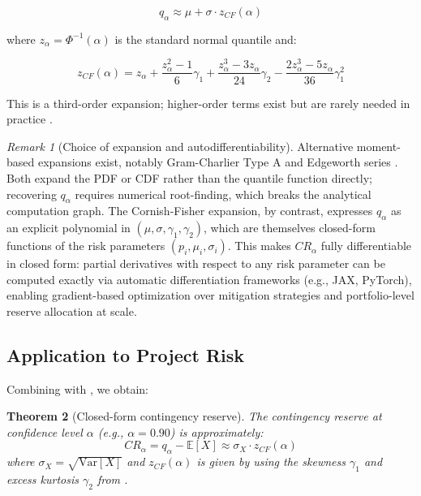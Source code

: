 \documentclass[12pt,a4paper]{article}
\newtheorem{theorem}{Theorem}[section]
\theoremstyle{definition}
\theoremstyle{remark}
\newtheorem{remark}[theorem]{Remark}
\newcommand{\E}{\mathbb{E}}
\newcommand{\Var}{\mathrm{Var}}
\begin{document}
\begin{equation}
    q_\alpha \approx \mu + \sigma \cdot z_{CF}(\alpha)
\end{equation}

where $z_\alpha = \Phi^{-1}(\alpha)$ is the standard normal quantile and:

\begin{equation}
\label{eq:cornish_fisher}
    z_{CF}(\alpha) = z_\alpha + \frac{z_\alpha^2 - 1}{6}\gamma_1 + \frac{z_\alpha^3 - 3z_\alpha}{24}\gamma_2 - \frac{2z_\alpha^3 - 5z_\alpha}{36}\gamma_1^2
\end{equation}

This is a third-order expansion; higher-order terms exist but are rarely needed in practice \citep{Maillard2012}.

\begin{remark}[Choice of expansion and autodifferentiability]
Alternative moment-based expansions exist, notably Gram-Charlier Type A and Edgeworth series \citep{Embrechts1997}. Both expand the PDF or CDF rather than the quantile function directly; recovering $q_\alpha$ requires numerical root-finding, which breaks the analytical computation graph. The Cornish-Fisher expansion, by contrast, expresses $q_\alpha$ as an explicit polynomial in $(\mu, \sigma, \gamma_1, \gamma_2)$, which are themselves closed-form functions of the risk parameters $(p_i, \mu_i, \sigma_i)$. This makes $CR_\alpha$ fully differentiable in closed form: partial derivatives with respect to any risk parameter can be computed exactly via automatic differentiation frameworks (e.g., JAX, PyTorch), enabling gradient-based optimization over mitigation strategies and portfolio-level reserve allocation at scale.
\end{remark}

\subsection{Application to Project Risk}

Combining  with , we obtain:

\begin{theorem}[Closed-form contingency reserve]
\label{thm:contingency}
The contingency reserve at confidence level $\alpha$ (e.g., $\alpha = 0.90$) is approximately:
\begin{equation}
    CR_\alpha = q_\alpha - \E[X] \approx \sigma_X \cdot z_{CF}(\alpha)
\end{equation}
where $\sigma_X = \sqrt{\Var[X]}$ and $z_{CF}(\alpha)$ is given by  using the skewness $\gamma_1$ and excess kurtosis $\gamma_2$ from .
\end{theorem}
\end{document}
